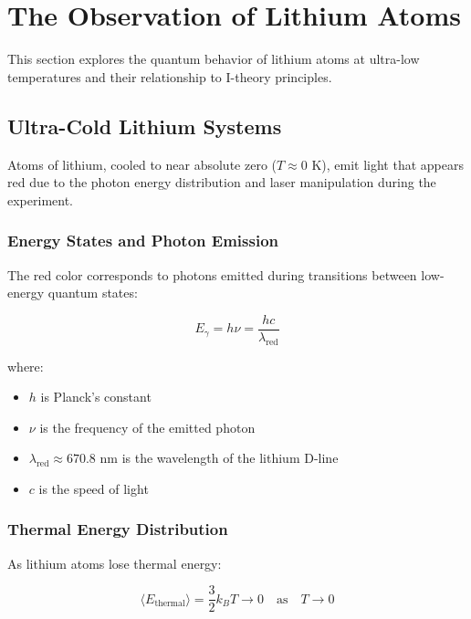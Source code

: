 \section{The Observation of Lithium Atoms}
\label{sec:lithium_atoms}

This section explores the quantum behavior of lithium atoms at ultra-low temperatures and their relationship to I-theory principles.

\subsection{Ultra-Cold Lithium Systems}
\label{subsec:ultracold_lithium}

Atoms of lithium, cooled to near absolute zero ($T \approx 0$ K), emit light that appears red due to the photon energy distribution and laser manipulation during the experiment.

\subsubsection{Energy States and Photon Emission}

The red color corresponds to photons emitted during transitions between low-energy quantum states:

\begin{equation}
\label{eq:photon_energy}
E_{\gamma} = h\nu = \frac{hc}{\lambda_{\text{red}}}
\end{equation}

where:
\begin{itemize}
    \item $h$ is Planck's constant
    \item $\nu$ is the frequency of the emitted photon
    \item $\lambda_{\text{red}} \approx 670.8$ nm is the wavelength of the lithium D-line
    \item $c$ is the speed of light
\end{itemize}

\subsubsection{Thermal Energy Distribution}

As lithium atoms lose thermal energy:

\begin{equation}
\label{eq:thermal_energy}
\langle E_{\text{thermal}} \rangle = \frac{3}{2}k_B T \to 0 \quad \text{as} \quad T \to 0
\end{equation}


